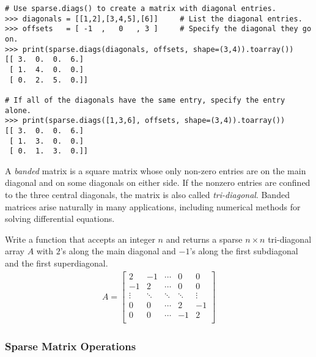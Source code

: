 \begin{itemize}
\begin{lstlisting}
# Use sparse.diags() to create a matrix with diagonal entries.
>>> diagonals = [[1,2],[3,4,5],[6]]     # List the diagonal entries.
>>> offsets   = [ -1  ,   0   , 3 ]     # Specify the diagonal they go on.
>>> print(sparse.diags(diagonals, offsets, shape=(3,4)).toarray())
[[ 3.  0.  0.  6.]
 [ 1.  4.  0.  0.]
 [ 0.  2.  5.  0.]]

# If all of the diagonals have the same entry, specify the entry alone.
>>> print(sparse.diags([1,3,6], offsets, shape=(3,4)).toarray())
[[ 3.  0.  0.  6.]
 [ 1.  3.  0.  0.]
 [ 0.  1.  3.  0.]]
\end{lstlisting}

\end{itemize}

\begin{info} %
A \emph{banded} matrix is a square matrix whose only non-zero entries are on the main diagonal and on some diagonals on either side.
If the nonzero entries are confined to the three central diagonals, the matrix is also called \emph{tri-diagonal}.
Banded matrices arise naturally in many applications, including numerical methods for solving differential equations.
\end{info}

\begin{problem} %
Write a function that accepts an integer $n$ and returns a sparse $n\times n$
tri-diagonal array $A$ with $2$'s along the main diagonal and $-1$'s along
the first subdiagonal and the first superdiagonal.
%
\begin{align*}
A =
\left[\begin{array}{rrrrr}
 2 & -1 & \cdots &  0 &  0 \\
-1 &  2 & \cdots &  0 &  0 \\
\vdots & \ddots & \ddots & \ddots & \vdots \\
 0 &  0 & \cdots &  2 & -1 \\
 0 &  0 & \cdots & -1 &  2 \\
\end{array}\right]
\end{align*}
%
\label{prob:sparse-tridiag-construction}
\end{problem}

\subsubsection*{Sparse Matrix Operations} %

